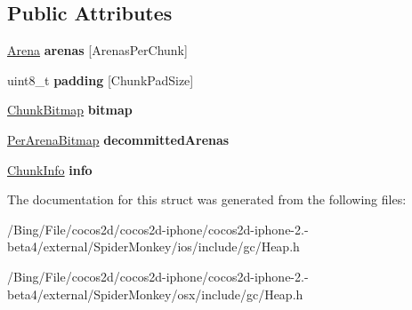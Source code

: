 \subsection*{Public Attributes}
\begin{DoxyCompactItemize}
\item 
\hypertarget{structjs_1_1gc_1_1_chunk_a7cf36678313c4cb4ea111690fbd5349a}{\hyperlink{structjs_1_1gc_1_1_arena}{Arena} {\bfseries arenas} \mbox{[}Arenas\-Per\-Chunk\mbox{]}}\label{structjs_1_1gc_1_1_chunk_a7cf36678313c4cb4ea111690fbd5349a}

\item 
\hypertarget{structjs_1_1gc_1_1_chunk_a483de9f295e07ae72b73f41196d6c2a1}{uint8\-\_\-t {\bfseries padding} \mbox{[}Chunk\-Pad\-Size\mbox{]}}\label{structjs_1_1gc_1_1_chunk_a483de9f295e07ae72b73f41196d6c2a1}

\item 
\hypertarget{structjs_1_1gc_1_1_chunk_a18c6d6def5d066aa7bb5ed2b63f47d06}{\hyperlink{structjs_1_1gc_1_1_chunk_bitmap}{Chunk\-Bitmap} {\bfseries bitmap}}\label{structjs_1_1gc_1_1_chunk_a18c6d6def5d066aa7bb5ed2b63f47d06}

\item 
\hypertarget{structjs_1_1gc_1_1_chunk_abfa4dd8240749a09cbc06e51b35703fb}{\hyperlink{classjs_1_1_bit_array}{Per\-Arena\-Bitmap} {\bfseries decommitted\-Arenas}}\label{structjs_1_1gc_1_1_chunk_abfa4dd8240749a09cbc06e51b35703fb}

\item 
\hypertarget{structjs_1_1gc_1_1_chunk_a3f30390b2046eeac44efde73c7c1bb17}{\hyperlink{structjs_1_1gc_1_1_chunk_info}{Chunk\-Info} {\bfseries info}}\label{structjs_1_1gc_1_1_chunk_a3f30390b2046eeac44efde73c7c1bb17}

\end{DoxyCompactItemize}


The documentation for this struct was generated from the following files\-:\begin{DoxyCompactItemize}
\item 
/\-Bing/\-File/cocos2d/cocos2d-\/iphone/cocos2d-\/iphone-\/2.-\/beta4/external/\-Spider\-Monkey/ios/include/gc/Heap.\-h\item 
/\-Bing/\-File/cocos2d/cocos2d-\/iphone/cocos2d-\/iphone-\/2.-\/beta4/external/\-Spider\-Monkey/osx/include/gc/Heap.\-h\end{DoxyCompactItemize}
